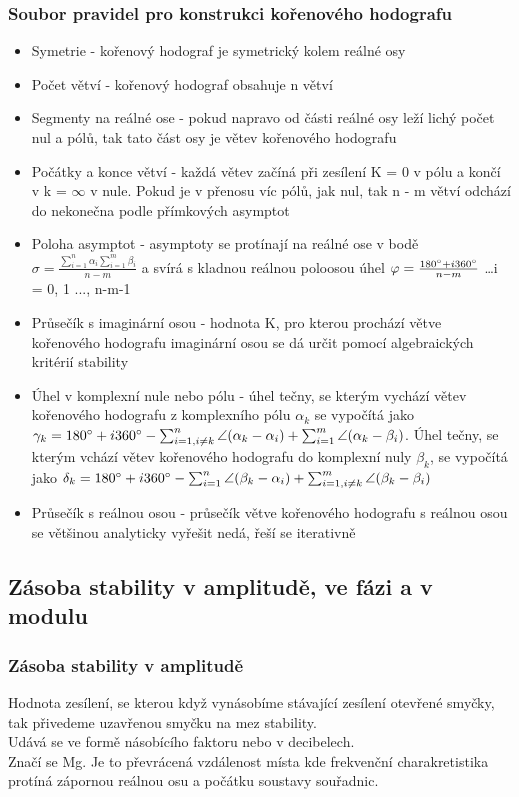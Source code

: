 \subsubsection*{Soubor pravidel pro konstrukci kořenového hodografu}
\begin{itemize}
    \item Symetrie - kořenový hodograf je symetrický kolem reálné osy
    \item Počet větví - kořenový hodograf obsahuje n větví
    \item Segmenty na reálné ose - pokud napravo od části reálné osy leží lichý počet nul a pólů, tak tato část osy je větev kořenového hodografu
    \item Počátky a konce větví - každá větev začíná při zesílení K = 0 v pólu a končí v k = $\infty$ v nule. Pokud je v přenosu víc pólů, jak nul, tak n - m větví odchází do nekonečna podle přímkových asymptot
    \item Poloha asymptot - asymptoty se protínají na reálné ose v bodě $\sigma = \frac{\sum^n_{i=1} \alpha_i \sum^m_{i=1}\beta_i}{n-m}$ a svírá s kladnou reálnou poloosou úhel $\varphi = \frac{180 \degree + i360\degree}{n - m}$ \dots i = 0, 1 ..., n-m-1
    \item Průsečík s imaginární osou - hodnota K, pro kterou prochází větve kořenového hodografu imaginární osou se dá určit pomocí algebraických kritérií stability
    \item Úhel v komplexní nule nebo pólu - úhel tečny, se kterým vychází větev kořenového hodografu z komplexního pólu $\alpha_k$ se vypočítá jako $\gamma_k = 180 \degree + i360 \degree -\sum^n_{i=1, i\neq k}\angle(\alpha_k - \alpha_i) + \sum^m_{i=1}\angle(\alpha_k - \beta_i)$. Úhel tečny, se kterým vchází větev kořenového hodografu do komplexní nuly $\beta_k$, se vypočítá jako $\delta_k = 180 \degree + i360 \degree -\sum^n_{i=1}\angle(\beta_k - \alpha_i) + \sum^m_{i=1, i\neq k}\angle(\beta_k - \beta_i)$
    \item Průsečík s reálnou osou - průsečík větve kořenového hodografu s reálnou osou se většinou analyticky vyřešit nedá, řeší se iterativně
\end{itemize}
\subsection*{Zásoba stability v amplitudě, ve fázi a v modulu}
\subsubsection*{Zásoba stability v amplitudě}
Hodnota zesílení, se kterou když vynásobíme stávající zesílení otevřené smyčky, tak přivedeme uzavřenou smyčku na mez stability.\\
Udává se ve formě násobícího faktoru nebo v decibelech.\\
Značí se Mg. Je to převrácená vzdálenost místa kde frekvenční charakretistika protíná zápornou reálnou osu a počátku soustavy souřadnic.\\

